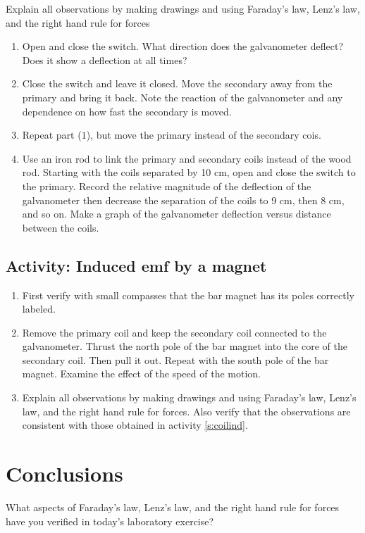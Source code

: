 	Explain all observations by making drawings and using Faraday's law, Lenz's law, and the \textsf{right hand rule for forces}
\begin{enumerate}
	 \item Open and close the switch.  What direction does the galvanometer deflect?  Does it show a deflection at all times?  
	\item Close the switch and leave it closed.  Move the secondary away from the primary and bring it back.  Note the reaction of the galvanometer and any dependence on how fast the secondary is moved.
	\item Repeat part ($1$), but move the primary instead of the secondary cois.
	\item Use an iron rod to link the primary and secondary coils instead of the wood rod.  Starting with the coils separated by 10 cm, open and close the switch to the primary.  Record the relative magnitude of the deflection of the galvanometer then decrease the separation of the coils to 9 cm, then 8 cm, and so on.  Make a graph of the galvanometer deflection versus distance between the coils. 
\end{enumerate}

\subsection{Activity: Induced emf by a magnet}
\begin{enumerate}
	 \item First verify with small compasses that the bar magnet has its poles correctly labeled.
	\item  Remove the primary coil and keep the secondary coil connected to the galvanometer.  Thrust the north pole of the bar magnet into the core of the secondary coil.  Then pull it out.  Repeat with the south pole of the bar magnet.  Examine the effect of the speed of the motion.  
	\item Explain all observations by making drawings and using Faraday's law, Lenz's law, and the \textsf{right hand rule for forces}.  Also verify that the observations are consistent with those obtained in activity \ref{s:coilind}. 
\end{enumerate}

\section{Conclusions}
 What aspects of Faraday's law, Lenz's law, and the \textsf{right hand rule for forces} have you verified in today's laboratory exercise?
 

\endinput
